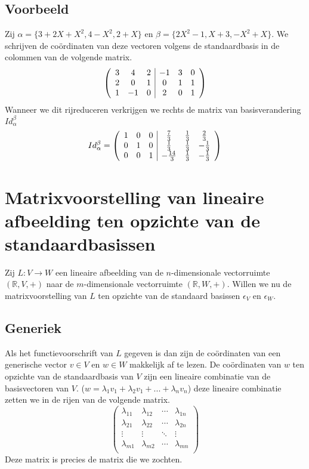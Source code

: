 \documentclass[lineaire_algebra_oplossingen.tex]{subfiles}
\begin{document}
\subsection*{Voorbeeld}
Zij $\alpha = \{3+2X+X^2,4-X^2,2+X\}$ en $\beta = \{2X^2-1,X+3,-X^2+X\}$.
We schrijven de co\"ordinaten van deze vectoren volgens de standaardbasis in de colommen van de volgende matrix.
\[
\left(
\begin{array}{c c c | c c c}
3 & 4 & 2 & -1 & 3 & 0\\
2 & 0 & 1 & 0 & 1 & 1\\
1 & -1 & 0 & 2 & 0 & 1\\
\end{array}
\right)
\]
Wanneer we dit rijreduceren verkrijgen we rechts de matrix van basisverandering $Id_\alpha^\beta$
\[
Id_\alpha^\beta =
\left(
\begin{array}{c c c | c c c}
1 & 0 & 0 & \frac{7}{3} & \frac{1}{3} & \frac{2}{3}\\
0 & 1 & 0 & \frac{1}{3} & \frac{1}{3} & -\frac{1}{3}\\
0 & 0 & 1 & -\frac{14}{3} & \frac{1}{3} & -\frac{1}{3}\\
\end{array}
\right)
\]

\section{Matrixvoorstelling van lineaire afbeelding ten opzichte van de standaardbasissen}
Zij $L:V\rightarrow W$ een lineaire afbeelding van de $n$-dimensionale vectorruimte $(\mathbb{R},V,+)$ naar de $m$-dimensionale vectorruimte $(\mathbb{R},W,+)$. Willen we nu de matrixvoorstelling van $L$ ten opzichte van de standaard basissen $\epsilon_V$ en $\epsilon_W$.

\subsection*{Generiek}
Als het functievoorschrift van $L$ gegeven is dan zijn de co\"ordinaten van een generische vector $v\in V$ en $w\in W$ makkelijk af te lezen.
De co\"ordinaten van $w$ ten opzichte van de standaardbasis van $V$ zijn een lineaire combinatie van de basisvectoren van $V$. ($w = \lambda_1v_1+\lambda_2v_1+...+\lambda_nv_n$) deze lineaire combinatie zetten we in de rijen van de volgende matrix.
\[
\begin{pmatrix}
\lambda_{11} & \lambda_{12} & \cdots & \lambda_{1n} \\
\lambda_{21} & \lambda_{22} & \cdots & \lambda_{2n} \\
\vdots & \vdots & \ddots & \vdots\\
\lambda_{m1} & \lambda_{m2} & \cdots & \lambda_{mn} \\
\end{pmatrix}
\]
Deze matrix is precies de matrix die we zochten.
\end{document}
